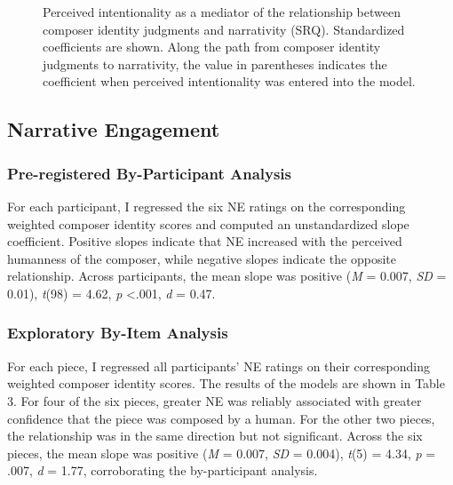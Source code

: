 \documentclass[12pt,twoside]{reedthesis}
\begin{document}
\usetikzlibrary{positioning}

\begin{figure}[h!tbp]
	\centering
{}
  \caption{Perceived intentionality as a mediator of the relationship between composer identity judgments and narrativity (SRQ). Standardized coefficients are shown. Along the path from composer identity judgments to narrativity, the value in parentheses indicates the coefficient when perceived intentionality was entered into the model.
  }
  \label{fig-intentionality-srq}
\end{figure}


\subsection{Narrative Engagement}
\subsubsection*{Pre-registered By-Participant Analysis}

For each participant, I regressed the six NE ratings on the corresponding weighted composer identity scores and computed an unstandardized slope coefficient. Positive slopes indicate that NE increased with the perceived humanness of the composer, while negative slopes indicate the opposite relationship. Across participants, the mean slope was positive (\emph{M} = 0.007, \emph{SD} = 0.01), \emph{t}(98) = 4.62, \emph{p} \textless .001, \emph{d} = 0.47. 

\subsubsection*{Exploratory By-Item Analysis}

For each piece, I regressed all participants’ NE ratings on their corresponding weighted composer identity scores. The results of the models are shown in Table 3. For four of the six pieces, greater NE was reliably associated with greater confidence that the piece was composed by a human. For the other two pieces, the relationship was in the same direction but not significant. Across the six pieces, the mean slope was positive (\emph{M} = 0.007, \emph{SD} = 0.004), \emph{t}(5) = 4.34, \emph{p} = .007, \emph{d} = 1.77, corroborating the by-participant analysis. 
\end{document}
